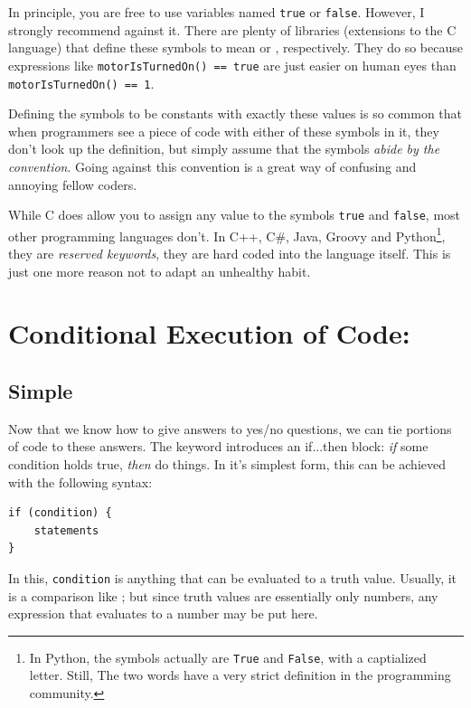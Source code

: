 \begin{warnbox}
In principle, you are free to use variables named \texttt{true} or \texttt{false}. However, I strongly recommend against it. There are plenty of libraries (extensions to the C language) that define these symbols to mean  or , respectively. They do so because expressions like \texttt{motorIsTurnedOn() == true} are just easier on human eyes than \texttt{motorIsTurnedOn() == 1}.

Defining the symbols to be constants with exactly these values is so common that when programmers see a piece of code with either of these symbols in it, they don't look up the definition, but simply assume that the symbols \emph{abide by the convention}. Going against this convention is a great way of confusing and annoying fellow coders.

While C does allow you to assign any value to the symbols \texttt{true} and \texttt{false}, most other programming languages don't. In C++, C\#, Java, Groovy and Python\footnote{In Python, the symbols actually are \texttt{True} and \texttt{False}, with a captialized letter. Still, The two words have a very strict definition in the programming community.}, they are \emph{reserved keywords}, \ie they are hard coded into the language itself. This is just one more reason not to adapt an unhealthy habit.
\end{warnbox}

\section{Conditional Execution of Code: }
\subsection{Simple }
Now that we know how to give answers to yes/no questions, we can tie portions of code to these answers. The keyword  introduces an if...then block: \emph{if} some condition holds true, \emph{then} do things. In it's simplest form, this can be achieved with the following syntax:

\begin{codebox}
\begin{verbatim}
if (condition) {
    statements
}
\end{verbatim}
\end{codebox}

In this, \texttt{condition} is anything that can be evaluated to a truth value. Usually, it is a comparison like ; but since truth values are essentially only numbers, any expression that evaluates to a number may be put here.

